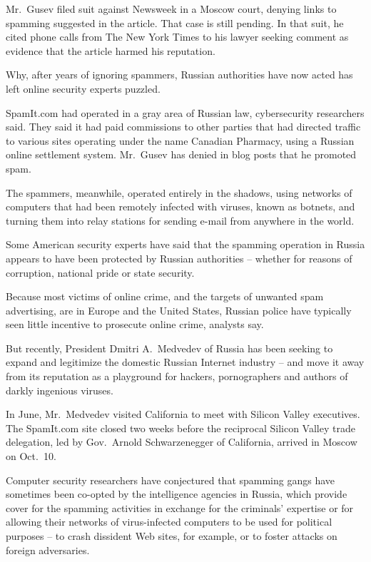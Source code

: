 ﻿\documentclass[12pt]{article}
\begin{document}
Mr.~Gusev filed suit against Newsweek in a Moscow court, denying links to spamming suggested in the
article. That case is still pending. In that suit, he cited phone calls from The New York Times to
his lawyer seeking comment as evidence that the article harmed his reputation.

Why, after years of ignoring spammers, Russian authorities have now acted has left online security
experts puzzled.

SpamIt.com had operated in a gray area of Russian law, cybersecurity researchers said. They said it
had paid commissions to other parties that had directed traffic to various sites operating under the
name Canadian Pharmacy, using a Russian online settlement system. Mr.~Gusev has denied in blog posts
that he promoted spam.

The spammers, meanwhile, operated entirely in the shadows, using networks of computers that had been
remotely infected with viruses, known as botnets, and turning them into relay stations for sending
e-mail from anywhere in the world.

Some American security experts have said that the spamming operation in Russia appears to have been
protected by Russian authorities -- whether for reasons of corruption, national pride or state
security.

Because most victims of online crime, and the targets of unwanted spam advertising, are in Europe
and the United States, Russian police have typically seen little incentive to prosecute online
crime, analysts say.

But recently, President Dmitri A.~Medvedev of Russia has been seeking to expand and legitimize the
domestic Russian Internet industry -- and move it away from its reputation as a playground for
hackers, pornographers and authors of darkly ingenious viruses.

In June, Mr.~Medvedev visited California to meet with Silicon Valley executives. The SpamIt.com site
closed two weeks before the reciprocal Silicon Valley trade delegation, led by Gov.~Arnold
Schwarzenegger of California, arrived in Moscow on Oct.~10.

Computer security researchers have conjectured that spamming gangs have sometimes been co-opted by
the intelligence agencies in Russia, which provide cover for the spamming activities in exchange for
the criminals' expertise or for allowing their networks of virus-infected computers to be used for
political purposes -- to crash dissident Web sites, for example, or to foster attacks on foreign
adversaries.
\end{document}

